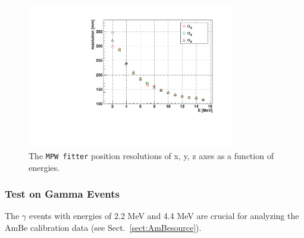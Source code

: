 \begin{figure}[htbp]
	\centering	
	\includegraphics[width=9cm]{MPW_posResolVsE.pdf}
	\caption{The \texttt{MPW fitter} position resolutions of x, y, z axes as a function of energies.}
	\label{fig:MPWposResol_isoFill}
\end{figure}

\subsubsection{Test on Gamma Events}

The $\gamma$ events with energies of 2.2 MeV and 4.4 MeV are crucial for analyzing the AmBe calibration data (see Sect.~\ref{sect:AmBesource}). 

